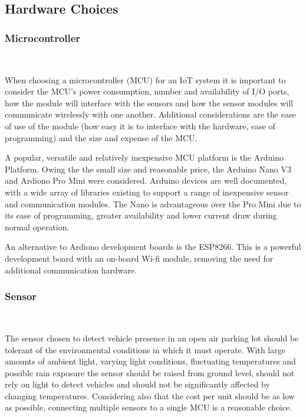 \documentclass[10pt,twocolumn]{witseiepaper}
\begin{document}
	\subsection{Hardware Choices} 
	
		\subsubsection{Microcontroller} $   $
		
			When choosing a microcontroller (MCU) for an IoT system it is important to consider the MCU's power consumption, number and availability of I/O ports, how the module will interface with the sensors and how the sensor modules will communicate wirelessly with one another. Additional considerations are the ease of use of the module (how easy it is to interface with the hardware, ease of programming) and the size and expense of the MCU.
			
			A popular, versatile and relatively inexpensive MCU platform is the Arduino Platform. Owing the the small size and reasonable price, the Arduino Nano V3 and Ardiono Pro Mini were considered. Arduino devices are well documented, with a wide array of libraries existing to support a range of inexpensive sensor and communication modules. The Nano is advantageous over the Pro Mini due to its ease of programming, greater availability and lower current draw during normal operation.

			An alternative to Ardiono development boards is the ESP8266. This is a powerful development board with an on-board Wi-fi module, removing the need for additional communication hardware.
			
		\subsubsection{Sensor} $   $
			
			The sensor chosen to detect vehicle presence in an open air parking lot should be tolerant of the environmental conditions in which it must operate. With large amounts of ambient light, varying light conditions, fluctuating temperatures and possible rain exposure the sensor should be raised from ground level, should not rely on light to detect vehicles and should not be significantly affected by changing temperatures. Considering also that the cost per unit should be as low as possible, connecting multiple sensors to a single MCU is a reasonable choice.
			 
\end{document}
